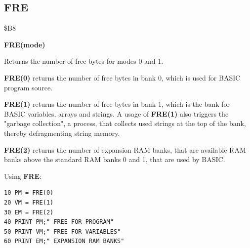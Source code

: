 \subsection{FRE}
\begin{description}[leftmargin=2cm,style=nextline]
\item [Token:] \$B8
\item [Format:] {\bf FRE(mode)}
\item [Usage:] Returns the number of free
               bytes for modes 0 and 1.

               {\bf FRE(0)} returns the number of free bytes in
               bank 0, which is used for BASIC program source.

               {\bf FRE(1)} returns the number of free bytes in
               bank 1, which is the bank for BASIC variables, arrays
               and strings. A usage of {\bf FRE(1)} also triggers the
               "garbage collection", a process, that collects
               used strings at the top of the bank, thereby
               defragmenting string memory.

               {\bf FRE(2)} returns the number of expansion
               RAM banks, that are available RAM banks above
               the standard RAM banks 0 and 1, that are used by BASIC.

\item [Example:] Using {\bf FRE}:
\begin{tcolorbox}[colback=black,coltext=white]
\verbatimfont{\codefont}
\begin{verbatim}
10 PM = FRE(0)
20 VM = FRE(1)
30 EM = FRE(2)
40 PRINT PM;" FREE FOR PROGRAM"
50 PRINT VM;" FREE FOR VARIABLES"
60 PRINT EM;" EXPANSION RAM BANKS"
\end{verbatim}
\end{tcolorbox}
\end{description}


\newpage
